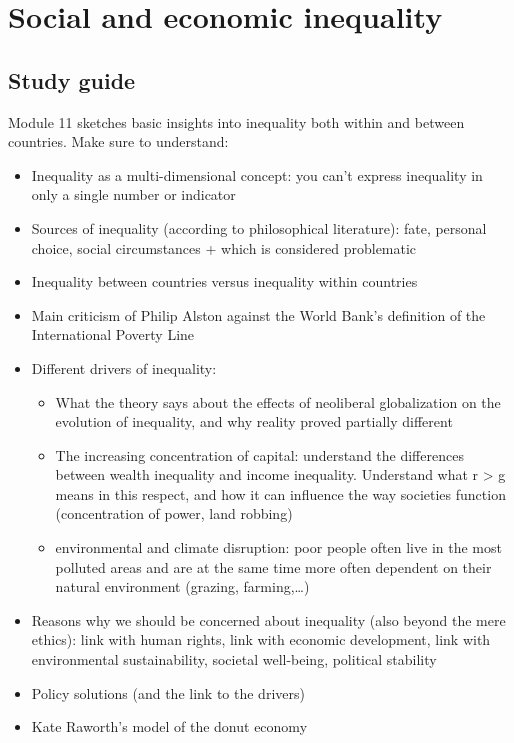 \documentclass[../summary.tex]{subfiles}
\begin{document}
	
	\section{Social and economic inequality}
	
	\subsection{Study guide}
	
	Module 11 sketches basic insights into inequality both within and between countries. Make sure to understand:
	\begin{itemize}
		\item Inequality as a multi-dimensional concept: you can’t express inequality in only a single number or indicator
		\item Sources of inequality (according to philosophical literature): fate, personal choice, social circumstances + which is considered problematic
		\item Inequality between countries versus inequality within countries
		\item Main criticism of Philip Alston against the World Bank’s 
		definition of the International Poverty Line
		\item Different drivers of inequality:
		\begin{itemize}
			\item What the theory says about the effects of neoliberal globalization on the evolution of inequality, and why reality proved partially different
			\item The increasing concentration of capital: understand the differences between wealth inequality and income inequality. Understand what r > g means in this respect, and how it can influence the way societies function (concentration of power, land robbing)
			\item environmental and climate disruption: poor people often live in the most polluted areas and are at the same time more often dependent on their natural environment (grazing, farming,…)
		\end{itemize}
		\item Reasons why we should be concerned about inequality (also beyond the mere ethics): link with human rights, link with economic development, link with environmental sustainability, societal well-being, political stability
		\item Policy solutions (and the link to the drivers)
		\item Kate Raworth’s model of the donut economy 
	\end{itemize}
	
\end{document}
